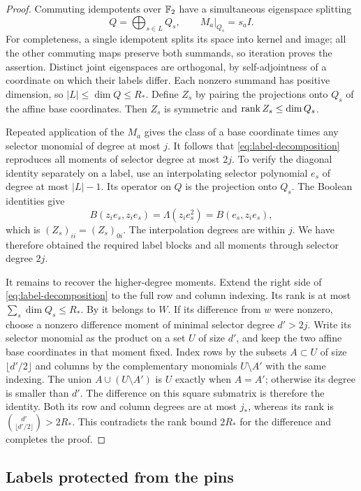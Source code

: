 \begin{proof}
Commuting idempotents over $\mathbb F_2$ have a simultaneous eigenspace
splitting
\[
 Q=\bigoplus_{s\in L}Q_s,
 \qquad M_a|_{Q_s}=s_a I.
\]
For completeness, a single idempotent splits its space into kernel
and image; all the other commuting maps preserve both summands,
so iteration proves the assertion.  Distinct joint eigenspaces
are orthogonal, by self-adjointness of a coordinate on which their
labels differ.  Each nonzero summand has positive dimension, so
$|L|\le\dim Q\le R_*$.  Define $Z_s$ by pairing the projections
onto $Q_s$ of the affine base coordinates.  Then $Z_s$ is symmetric
and $\operatorname{rank} Z_s\le\dim Q_s$.

Repeated application of the $M_a$ gives the class of a base
coordinate times any selector monomial of degree at most $j$.
It follows that \eqref{eq:label-decomposition} reproduces all
moments of selector degree at most $2j$.  To verify the diagonal
identity separately on a label, use an interpolating selector
polynomial $e_s$ of degree at most $|L|-1$.  Its operator on $Q$
is the projection onto $Q_s$.  The Boolean identities give
\[
 B(z_i e_s,z_i e_s)
 =\Lambda(z_i e_s^2)
 =B(e_s,z_i e_s),
\]
which is $(Z_s)_{ii}=(Z_s)_{0i}$.  The interpolation degrees are
within $j$.  We have therefore obtained the required label blocks
and all moments through selector degree $2j$.

It remains to recover the higher-degree moments.
Extend the right side of \eqref{eq:label-decomposition} to the
full row and column indexing.  Its rank is at most
$\sum_s\dim Q_s\le R_*$.  By  it belongs
to $W$.  If its difference from $w$ were nonzero, choose a
nonzero difference moment of minimal selector degree $d'>2j$.
Write its selector monomial as the product on a set $U$ of size
$d'$, and keep the two affine base coordinates in that moment
fixed.  Index rows by the subsets $A\subset U$ of size
$\lfloor d'/2\rfloor$ and columns by the complementary monomials
$U\setminus A'$ with the same indexing.  The union
$A\cup(U\setminus A')$ is $U$ exactly when $A=A'$; otherwise
its degree is smaller than $d'$.  The difference on this square
submatrix is therefore the identity.  Both its row and column
degrees are at most $j_*$, whereas its rank is
$\binom{d'}{\lfloor d'/2\rfloor}>2R_*$.  This contradicts the
rank bound $2R_*$ for the difference and completes the proof.
\end{proof}

\subsection{Labels protected from the pins}

